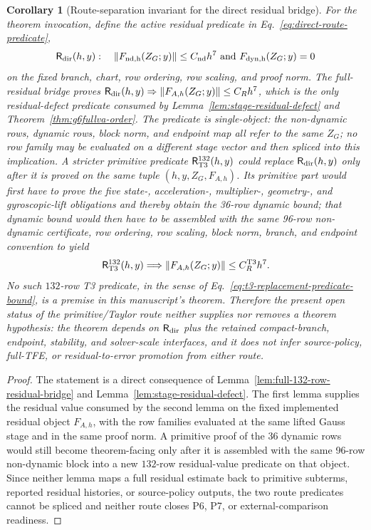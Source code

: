 \documentclass[preprint,12pt]{elsarticle}
\newtheorem{corollary}{Corollary}
\newcommand{\tfe}{TFE}
\begin{document}
\begin{corollary}[Route-separation invariant for the direct residual bridge]
\label{cor:route-separation-invariant}
For the theorem invocation, define the active residual predicate in
Eq.~\eqref{eq:direct-route-predicate},
\begin{equation}
\label{eq:direct-route-predicate}
  \mathsf R_{\rm dir}(h,y):
  \quad
  \|F_{\rm nd,h}(Z_G;y)\|\le C_{\rm nd}h^7
  \ \hbox{and}\ 
  F_{\rm dyn,h}(Z_G;y)=0
\end{equation}
on the fixed branch, chart, row ordering, row scaling, and proof norm.  The
full-residual bridge proves
\(\mathsf R_{\rm dir}(h,y)\Rightarrow
\|F_{A,h}(Z_G;y)\|\le C_Rh^7\), which is the only residual-defect predicate
consumed by Lemma~\ref{lem:stage-residual-defect} and
Theorem~\ref{thm:g6fullva-order}.  The predicate is single-object: the
non-dynamic rows, dynamic rows, block norm, and endpoint map all refer to the
same \(Z_G\); no row family may be evaluated on a different stage vector and
then spliced into this implication.  A stricter primitive predicate
\(\mathsf R_{\rm T3}^{132}(h,y)\) could replace
\(\mathsf R_{\rm dir}(h,y)\) only after it is proved on the same tuple
\((h,y,Z_G,F_{A,h})\).  Its primitive part would first have to prove the
five state-, acceleration-, multiplier-, geometry-, and gyroscopic-lift
obligations and thereby obtain the 36-row dynamic bound; that dynamic bound
would then have to be assembled with the same 96-row non-dynamic certificate,
row ordering, row scaling, block norm, branch, and endpoint convention to
yield
\begin{equation}
\label{eq:t3-replacement-predicate-bound}
  \mathsf R_{\rm T3}^{132}(h,y)\Longrightarrow
  \|F_{A,h}(Z_G;y)\|\le C_R^{\mathrm{T3}}h^7 .
\end{equation}
No such \(132\)-row T3 predicate, in the sense of
Eq.~\eqref{eq:t3-replacement-predicate-bound}, is a premise in this
manuscript's theorem.
Therefore the present open status of the primitive/Taylor route neither
supplies nor removes a theorem hypothesis: the theorem depends on
\(\mathsf R_{\rm dir}\) plus the retained compact-branch, endpoint,
stability, and solver-scale interfaces, and it does not infer source-policy,
full-\tfe{}, or residual-to-error promotion from either route.
\end{corollary}

\begin{proof}
The statement is a direct consequence of
Lemma~\ref{lem:full-132-row-residual-bridge} and
Lemma~\ref{lem:stage-residual-defect}.  The first lemma supplies the
residual value consumed by the second lemma on the fixed implemented residual
object \(F_{A,h}\), with the row families evaluated at the same lifted Gauss
stage and in the same proof norm.  A primitive proof of the 36 dynamic rows
would still become theorem-facing only after it is assembled with the same
96-row non-dynamic block into a new \(132\)-row residual-value predicate on
that object.  Since neither lemma maps a full residual estimate back to
primitive subterms, reported residual histories, or source-policy outputs,
the two route predicates cannot be spliced and neither route closes P6, P7,
or external-comparison readiness.
\end{proof}
\end{document}
